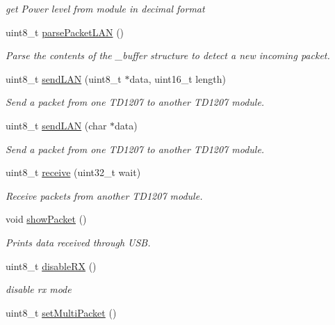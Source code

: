 \begin{DoxyCompactItemize}
\begin{DoxyCompactList}\small\item\em get Power level from module in decimal format \end{DoxyCompactList}\item 
uint8\+\_\+t \hyperlink{class_wasp_sigfox_ab32d236e767b0afc33968d21ee2b8299}{parse\+Packet\+L\+AN} ()
\begin{DoxyCompactList}\small\item\em Parse the contents of the \textquotesingle{}\+\_\+buffer\textquotesingle{} structure to detect a new incoming packet. \end{DoxyCompactList}\item 
uint8\+\_\+t \hyperlink{class_wasp_sigfox_afdacc0865476dec08911615a8df5d052}{send\+L\+AN} (uint8\+\_\+t $\ast$data, uint16\+\_\+t length)
\begin{DoxyCompactList}\small\item\em Send a packet from one T\+D1207 to another T\+D1207 module. \end{DoxyCompactList}\item 
uint8\+\_\+t \hyperlink{class_wasp_sigfox_adefc4b60ec2f3367b718e5f7c176474d}{send\+L\+AN} (char $\ast$data)
\begin{DoxyCompactList}\small\item\em Send a packet from one T\+D1207 to another T\+D1207 module. \end{DoxyCompactList}\item 
uint8\+\_\+t \hyperlink{class_wasp_sigfox_a545dd58cc9f9fc2ea94fbd33f35f2a49}{receive} (uint32\+\_\+t wait)
\begin{DoxyCompactList}\small\item\em Receive packets from another T\+D1207 module. \end{DoxyCompactList}\item 
void \hyperlink{class_wasp_sigfox_abeeaf5b3802b89b94cfa70b25e1d951d}{show\+Packet} ()
\begin{DoxyCompactList}\small\item\em Prints data received through U\+SB. \end{DoxyCompactList}\item 
uint8\+\_\+t \hyperlink{class_wasp_sigfox_ab97ba0717709997713935886ff83e69c}{disable\+RX} ()
\begin{DoxyCompactList}\small\item\em disable rx mode \end{DoxyCompactList}\item 
uint8\+\_\+t \hyperlink{class_wasp_sigfox_a074e102ec0db1603811f0f64baacb578}{set\+Multi\+Packet} ()

\end{DoxyCompactItemize}
